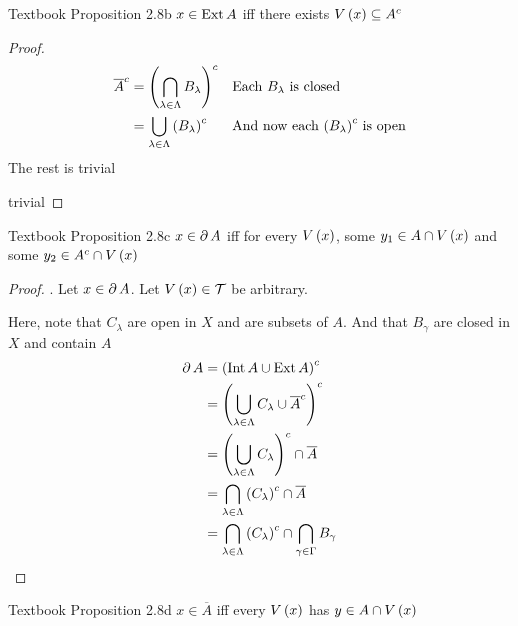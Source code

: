 \documentclass{article}
\begin{document}
\begin{proposition}{Textbook Proposition 2.8b}
\label{book:prop:2.8b}
    $x \in \textnormal{Ext} \, A$ iff there exists $V\left(x\right) \subseteq A^c$
\end{proposition}
\begin{proof}
    \forwarddir 
    \begin{align*}
        \overline{A}^c &= \left(\bigcap_{\lambda \in \Lambda} B_\lambda\right)^c  &&\text{Each $B_\lambda$ is closed} \\
        &= \bigcup_{\lambda \in \Lambda} \left(B_\lambda\right)^c && \text{And now each $\left(B_\lambda\right)^c$ is open}
    \end{align*}
    The rest is trivial
    
    \conversedir trivial
    
\end{proof}
\begin{proposition}{Textbook Proposition 2.8c}
\label{book:prop:2.8c}
    $x \in \partial \, A$ iff for every $V\left(x\right)$, some $y_1 \in A \cap V\left(x\right)$ and 
    some $y_2 \in A^c \cap V\left(x\right)$
\end{proposition}
\begin{proof}
    \forwarddir. Let $x \in \partial \, A$. Let $V\left(x\right) \in \mathcal{T}$ be arbitrary.

    Here, note that $C_\lambda$ are open in $X$ and are subsets of $A$.
    And that $B_\gamma$ are closed in $X$ and contain $A$
    \begin{align*}
        \partial \, A &= \left(\textnormal{Int} \, A \cup \textnormal{Ext} \, A\right)^c \\
        &= \left(\bigcup_{\lambda \in \Lambda} C_\lambda \cup \overline{A}^c\right)^c \\ 
        &= \left(\bigcup_{\lambda \in \Lambda} C_\lambda\right)^c \cap \overline{A} \\
        &= \bigcap_{\lambda \in \Lambda} \left(C_\lambda\right)^c \cap \overline{A} \\
        &= \bigcap_{\lambda \in \Lambda} \left(C_\lambda\right)^c \cap \bigcap_{\gamma \in \Gamma} B_\gamma
    \end{align*}
\end{proof}
\begin{proposition}{Textbook Proposition 2.8d}
\label{book:prop:2.8d}
    $x \in \overline{A}$ iff every $V\left(x\right)$ has $y \in A \cap V\left(x\right)$
\end{proposition}
\end{document}
